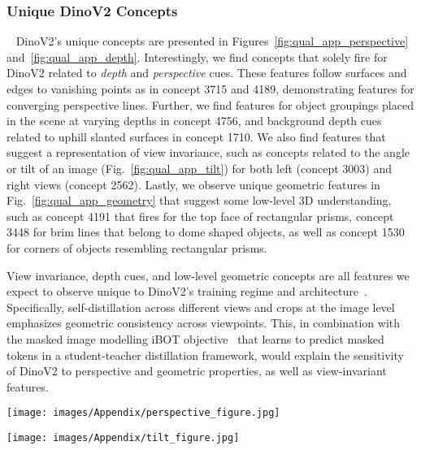 \subsubsection{Unique DinoV2 Concepts}~\label{appendix:unique_dino}
DinoV2's unique concepts are presented in Figures~\ref{fig:qual_app_perspective} and~\ref{fig:qual_app_depth}. Interestingly, we find concepts that solely fire for DinoV2 related to \textit{depth} and \textit{perspective} cues. These features follow surfaces and edges to vanishing points as in concept 3715 and 4189, demonstrating features for converging perspective lines. Further, we find features for object groupings placed in the scene at varying depths in concept 4756, and background depth cues related to uphill slanted surfaces in concept 1710. We also find features that suggest a representation of view invariance, such as concepts related to the angle or tilt of an image (Fig.~\ref{fig:qual_app_tilt}) for both left (concept 3003) and right views (concept 2562). Lastly, we observe unique geometric features in Fig.~\ref{fig:qual_app_geometry} that suggest some low-level 3D understanding, such as concept 4191 that fires for the top face of rectangular prisms, concept 3448 for brim lines that belong to dome shaped objects, as well as concept 1530 for corners of objects resembling rectangular prisms. 

View invariance, depth cues, and low-level geometric concepts are all features we expect to observe unique to DinoV2's training regime and architecture~\cite{oquab2023dinov2}. Specifically, self-distillation across different views and crops at the image level emphasizes geometric consistency across viewpoints. This, in combination with the masked image modelling iBOT objective~\cite{zhou2021ibot} that learns to predict masked tokens in a student-teacher distillation framework, would explain the sensitivity of DinoV2 to perspective and geometric properties, as well as view-invariant features. 

\begin{figure*}[t]
    \centering
    \texttt{[image: images/Appendix/perspective\_figure.jpg]}
    \caption{\textbf{Qualitative results of DinoV2 low-entropy concepts.} These concepts fire frequently for DinoV2, depicting converging perspective lines to the right (concept 3715, above) and to the left (concept 4189, below). }
    
    \label{fig:qual_app_perspective}
\end{figure*}

\begin{figure*}[t]
    \centering
    \texttt{[image: images/Appendix/tilt\_figure.jpg]}
    \caption{\textbf{Qualitative results of low-entropy concepts that fire for DinoV2.} We discover concepts related to view-invariance, such as angled scenes both right (above) and left (below) in concept 2562 and 3003, respectively. }
    \label{fig:qual_app_tilt}
\end{figure*}

